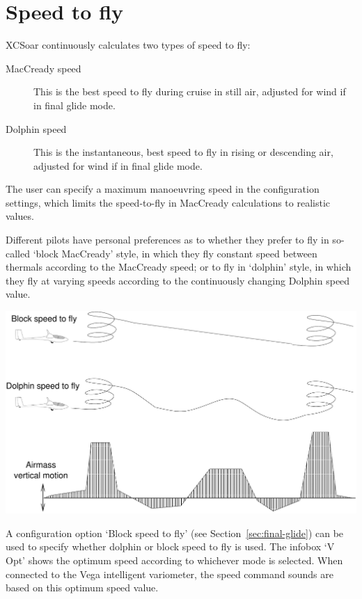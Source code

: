 \documentclass[a4paper,12pt]{refrep}
\begin{document}
\section{Speed to fly}

XCSoar continuously calculates two types of speed to fly:
\begin{description}
\item[MacCready speed]  This is the best speed to fly during cruise
  in still air, adjusted for wind if in final glide mode.
\item[Dolphin speed]  This is the instantaneous, best speed to fly
  in rising or descending air, adjusted for wind if in final glide
  mode.
\end{description}  

The user can specify a maximum manoeuvring speed in the configuration
settings, which limits the speed-to-fly in MacCready calculations to
realistic values.

Different pilots have personal preferences as to whether they prefer
to fly in so-called `block MacCready' style, in which they fly
constant speed between thermals according to the MacCready speed; or
to fly in `dolphin' style, in which they fly at varying speeds
according to the continuously changing Dolphin speed value.

\begin{maxipage}
\begin{center}
\includegraphics[angle=0,width=0.8\linewidth,keepaspectratio='true']{figures/blockmc.pdf}
\end{center}
\end{maxipage}

A configuration option `Block speed to fly' (see
Section~\ref{sec:final-glide}) can be used to specify whether dolphin
or block speed to fly is used.  The infobox `V Opt' shows the optimum
speed according to whichever mode is selected.  When connected to the
Vega intelligent variometer, the speed command sounds are based on
this optimum speed value.
\end{document}
